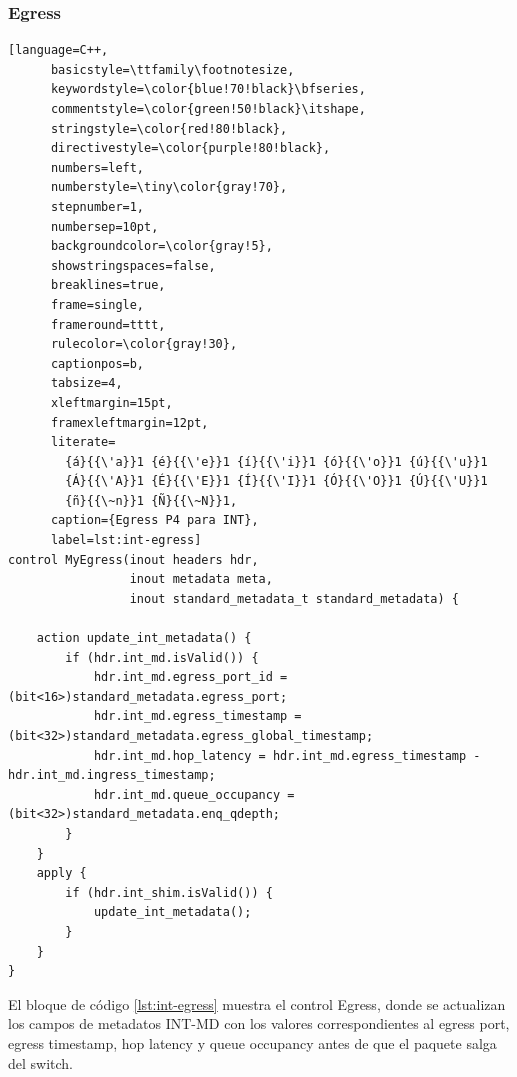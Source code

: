 \subsubsection{Egress}
  \begin{lstlisting}[language=C++,
      basicstyle=\ttfamily\footnotesize,
      keywordstyle=\color{blue!70!black}\bfseries,
      commentstyle=\color{green!50!black}\itshape,
      stringstyle=\color{red!80!black},
      directivestyle=\color{purple!80!black},
      numbers=left,
      numberstyle=\tiny\color{gray!70},
      stepnumber=1,
      numbersep=10pt,
      backgroundcolor=\color{gray!5},
      showstringspaces=false,
      breaklines=true,
      frame=single,
      frameround=tttt,
      rulecolor=\color{gray!30},
      captionpos=b,
      tabsize=4,
      xleftmargin=15pt,
      framexleftmargin=12pt,
      literate=
        {á}{{\'a}}1 {é}{{\'e}}1 {í}{{\'i}}1 {ó}{{\'o}}1 {ú}{{\'u}}1
        {Á}{{\'A}}1 {É}{{\'E}}1 {Í}{{\'I}}1 {Ó}{{\'O}}1 {Ú}{{\'U}}1
        {ñ}{{\~n}}1 {Ñ}{{\~N}}1,
      caption={Egress P4 para INT}, 
      label=lst:int-egress]
control MyEgress(inout headers hdr,
                 inout metadata meta,
                 inout standard_metadata_t standard_metadata) {

    action update_int_metadata() {
        if (hdr.int_md.isValid()) {
            hdr.int_md.egress_port_id = (bit<16>)standard_metadata.egress_port;
            hdr.int_md.egress_timestamp = (bit<32>)standard_metadata.egress_global_timestamp;
            hdr.int_md.hop_latency = hdr.int_md.egress_timestamp - hdr.int_md.ingress_timestamp;
            hdr.int_md.queue_occupancy = (bit<32>)standard_metadata.enq_qdepth;
        }
    }
    apply {
        if (hdr.int_shim.isValid()) {
            update_int_metadata();
        }
    }
}
\end{lstlisting}
El bloque de código \ref{lst:int-egress} muestra el control Egress, donde se actualizan los campos de metadatos INT-MD con los valores correspondientes al egress port, egress timestamp, hop latency y queue occupancy antes de que el paquete salga del switch.

